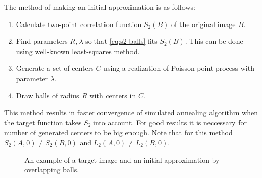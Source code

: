 \documentclass[preprint,amsmath,amssymb,aps,pre]{revtex4-1}
\begin{document}
The method of making an initial approximation is as follows:
\begin{enumerate}
\item Calculate two-point correlation function $S_2(B)$ of the original image
  $B$.
\item Find parameters $R, \lambda$ so that \cref{eq:s2-balls} fits
  $S_2(B)$. This can be done using well-known least-squares method.
\item Generate a set of centers $C$ using a realization of Poisson point process
  with parameter $\lambda$.
\item Draw balls of radius $R$ with centers in $C$.
\end{enumerate}
This method results in faster convergence of simulated annealing algorithm when
the target function takes $S_2$ into account. For good results it is neccessary
for number of generated centers to be big enough. Note that for this method
$S_2(A, 0) \ne S_2(B, 0)$ and $L_2(A, 0) \ne L_2(B, 0)$.
\begin{figure}[ht]
  \centering
  \hfill
  \caption[]{An example of a target image and an initial approximation by
    overlapping balls.}
  \label{fig:init-balls}
\end{figure}
\end{document}
